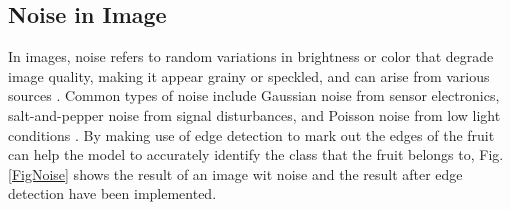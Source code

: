 \documentclass[conference]{IEEEtran}
\begin{document}
\subsection{Noise in Image}

In images, noise refers to random variations in brightness or color that degrade image quality, making it appear grainy or speckled, and can arise from various sources \cite{b19}. Common types of noise include Gaussian noise from sensor electronics, salt-and-pepper noise from signal disturbances, and Poisson noise from low light conditions \cite{b19}. By making use of edge detection to mark out the edges of the fruit \cite{b20} can help the model to accurately identify the class that the fruit belongs to, Fig. \ref{FigNoise} shows the result of an image wit noise and the result after edge detection have been implemented.
\end{document}
